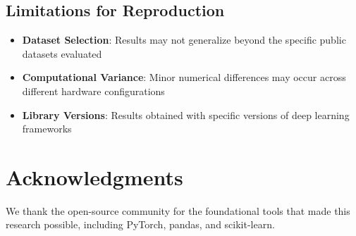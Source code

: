 \documentclass[11pt]{article}
\begin{document}
\subsection*{Limitations for Reproduction}

\begin{itemize}
\item \textbf{Dataset Selection}: Results may not generalize beyond the specific public datasets evaluated
\item \textbf{Computational Variance}: Minor numerical differences may occur across different hardware configurations
\item \textbf{Library Versions}: Results obtained with specific versions of deep learning frameworks
\end{itemize}

\section*{Acknowledgments}

We thank the open-source community for the foundational tools that made this research possible, including PyTorch, pandas, and scikit-learn.
\end{document}
